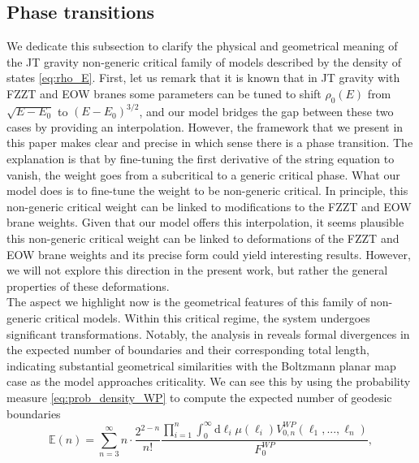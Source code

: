 \documentclass[a4paper,11pt]{article}
\newcommand{\rmd}{\mathrm{d}}
\begin{document}
\subsection{Phase transitions}
We dedicate this subsection to clarify the physical and geometrical meaning of the JT gravity non-generic critical family of models described by the density of states \eqref{eq:rho_E}. First, let us remark that it is known that in JT gravity with FZZT \cite{Okuyama:2021Page} and EOW \cite{Gao:2021uro} branes  some parameters can be tuned to shift $\rho_0(E)$ from $\sqrt{E-E_0}$ to $(E-E_0)^{3/2}$, and our model bridges the gap between these two cases by providing an interpolation. However, the framework that we present in this paper makes clear and precise in which sense there is a phase transition. The explanation is that by fine-tuning the first derivative of the string equation to vanish, the weight goes from a subcritical to a generic critical phase. What our model does is to fine-tune the weight to be non-generic critical. In principle, this non-generic critical weight can be linked to modifications to the FZZT and EOW brane weights. Given that our model offers this interpolation, it seems plausible this non-generic critical weight can be linked to deformations of the FZZT and EOW brane weights and its precise form could yield interesting results. However, we will not explore this direction in the present work, but rather the general properties of these deformations.\\
The aspect we highlight now is the geometrical features of this family of non-generic critical models. Within this critical regime, the system undergoes significant transformations. Notably, the analysis in \cite{budd2023} reveals formal divergences in the expected number of boundaries and their corresponding total length, indicating substantial geometrical similarities with the Boltzmann planar map case as the model approaches criticality.
We can see this by using the probability measure \eqref{eq:prob_density_WP} to compute the expected number of geodesic boundaries  
        \begin{equation}
           \mathbb{E}(n) = \sum_{n=3}^{\infty} n\cdot\frac{2^{2-n}}{n!} \frac{\prod_{i=1}^{n} \int_{0}^{\infty}\rmd \ell_i \mu(\ell_i) V^{WP}_{0,n}(\ell_1 , ... , \ell_n)}{F^{WP}_0},
        \end{equation}
\end{document}
